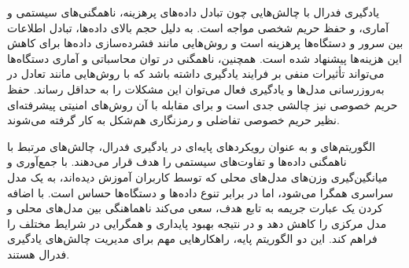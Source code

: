 یادگیری فدرال با چالش‌هایی چون تبادل داده‌های پرهزینه، ناهمگنی‌های سیستمی و آماری، و حفظ حریم شخصی مواجه است. به دلیل حجم بالای داده‌ها، تبادل اطلاعات بین سرور و دستگاه‌ها پرهزینه است و روش‌هایی مانند فشرده‌سازی داده‌ها برای کاهش این هزینه‌ها پیشنهاد شده است. همچنین، ناهمگنی در توان محاسباتی و آماری دستگاه‌ها می‌تواند تأثیرات منفی بر فرایند یادگیری داشته باشد که با روش‌هایی مانند تعادل در به‌روزرسانی مدل‌ها و یادگیری فعال می‌توان این مشکلات را به حداقل رساند. حفظ حریم خصوصی نیز چالشی جدی است و برای مقابله با آن روش‌های امنیتی پیشرفته‌ای نظیر حریم خصوصی تفاضلی و رمزنگاری هم‌شکل به کار گرفته می‌شوند.

الگوریتم‌های
و
به عنوان رویکردهای پایه‌ای در یادگیری فدرال، چالش‌های مرتبط با ناهمگنی داده‌ها و تفاوت‌های سیستمی را هدف قرار می‌دهند.
با جمع‌آوری و میانگین‌گیری وزن‌های مدل‌های محلی که توسط کاربران آموزش دیده‌اند، به یک مدل سراسری همگرا می‌شود، اما در برابر تنوع داده‌ها و دستگاه‌ها حساس است.
با اضافه کردن یک عبارت جریمه به تابع هدف، سعی می‌کند ناهماهنگی بین مدل‌های محلی و مدل مرکزی را کاهش دهد و در نتیجه بهبود پایداری و همگرایی در شرایط مختلف را فراهم کند. این دو الگوریتم پایه، راهکارهایی مهم برای مدیریت چالش‌های یادگیری فدرال هستند.